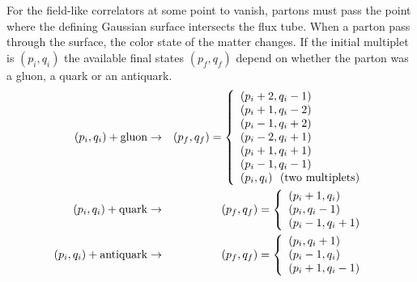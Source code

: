 \documentclass[aps, prc, 12pt, nofootinbib, showpacs, superscriptaddress, tightenlines, groupedaddress]{revtex4-2}
\begin{document}
For the field-like correlators at some point to vanish, partons must pass the point where the defining Gaussian surface intersects the flux tube. When a parton pass through the surface, the color state of the matter changes. If the initial multiplet is $(p_i,q_i)$ the available final states $(p_f,q_f)$ depend on whether the parton was a gluon, a quark or an antiquark.
\begin{eqnarray}\label{eq:pfqflist}
(p_i,q_i)+{\rm gluon}&\rightarrow& (p_f,q_f)=\left\{
\begin{array}{l}
(p_i+2,q_i-1)\\
(p_i+1,q_i-2)\\
(p_i-1,q_i+2)\\
(p_i-2,q_i+1)\\
(p_i+1,q_i+1)\\
(p_i-1,q_i-1)\\
(p_i,q_i)~~({\rm two~multiplets})
\end{array}
\right.\\
\nonumber
(p_i,q_i)+{\rm quark}&\rightarrow& (p_f,q_f)=\left\{
\begin{array}{l}
(p_i+1,q_i)\\
(p_i,q_i-1)\\
(p_i-1,q_i+1)
\end{array}
\right.\\
\nonumber
(p_i,q_i)+{\rm antiquark}&\rightarrow& (p_f,q_f)=\left\{\begin{array}{l}
(p_i,q_i+1)\\
(p_i-1,q_i)\\
(p_i+1,q_i-1)
\end{array}
\right.
\end{eqnarray}
\end{document}
